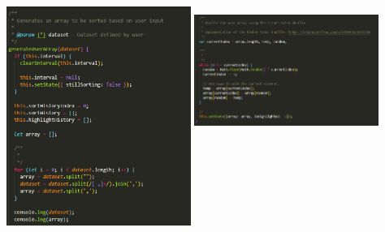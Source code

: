 \begin{center}
    \includegraphics[width=6cm,height=12cm,keepaspectratio]{images/userarray1}
    \includegraphics[width=6cm,height=15cm,keepaspectratio]{images/userarray2}
\end{center}
